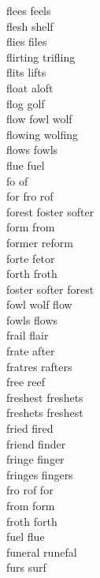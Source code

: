 flees feels\\
flesh shelf\\
flies files\\
flirting trifling\\
flits lifts\\
float aloft\\
flog golf\\
flow fowl wolf\\
flowing wolfing\\
flows fowls\\
flue fuel\\
fo of\\
for fro rof\\
forest foster softer\\
form from\\
former reform\\
forte fetor\\
forth froth\\
foster softer forest\\
fowl wolf flow\\
fowls flows\\
frail flair\\
frate after\\
fratres rafters\\
free reef\\
freshest freshets\\
freshets freshest\\
fried fired\\
friend finder\\
fringe finger\\
fringes fingers\\
fro rof for\\
from form\\
froth forth\\
fuel flue\\
funeral runefal\\
furs surf\\

